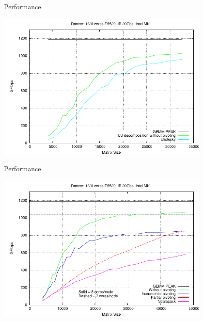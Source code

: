 \begin{frame}{Performance}
\begin{center}
\includegraphics[width=0.8\textwidth]{dgetrf_sp_problem.pdf} 
\end{center}
\end{frame}


\begin{frame}{Performance}
\begin{center}
\includegraphics[width=0.8\textwidth]{partial_pivoting_problem.pdf} 
\end{center}
\end{frame}
